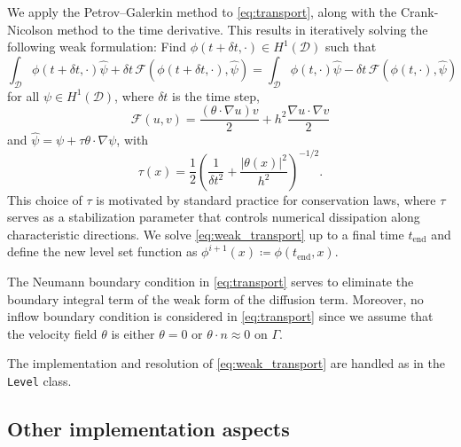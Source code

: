 \documentclass[preprint,9pt]{elsarticle}
\begin{document}
We apply the Petrov--Galerkin method \cite{MR1640142} to \eqref{eq:transport},
along with the Crank-Nicolson method to the time derivative.
This results in iteratively solving the following weak formulation:
Find $\phi(t+\delta t,\cdot)\in H^1(\mathcal{D})$ such that
\begin{equation}\label{eq:weak_transport}
	\int_{\mathcal{D}} \phi(t+\delta t,\cdot)\hat{\psi} +
		\delta t \, \mathcal{F}(\phi(t+\delta t,\cdot), \hat{\psi})
	= \int_{\mathcal{D}} \phi(t,\cdot) \hat{\psi} -
		\delta t \, \mathcal{F}(\phi(t,\cdot), \hat{\psi})	
\end{equation}
for all $\psi\in H^1(\mathcal{D})$, where $\delta t$ is the time step,
\[
	\mathcal{F}(u,v)=\frac{(\theta \cdot \nabla u) v}{2}
	+ h^2\frac{\nabla u \cdot \nabla v}{2}
\]
and $\hat{\psi}=\psi+\tau \theta\cdot\nabla\psi$, with 
\begin{equation}\label{eq:tau_lv}
	\tau(x) = \frac{1}{2}\left(\frac{1}{\delta t^2}
	+ \frac{|\theta(x)|^2}{h^2}\right)^{-1/2}.
\end{equation}
This choice of $\tau$ is motivated by standard practice for conservation laws,
where $\tau$ serves as a stabilization parameter that controls
numerical dissipation along characteristic directions.
We solve \eqref{eq:weak_transport} up to a final time $t_{\text{end}}$ and
define the new level set function as
$\phi^{i+1}(x)\coloneqq\phi(t_\text{end},x)$.

The Neumann boundary condition in \eqref{eq:transport} serves to eliminate
the boundary integral term of the weak form of the diffusion term.
Moreover, no inflow boundary condition is considered in \eqref{eq:transport}
since we assume that the velocity field $\theta$ is either $\theta = 0$ 
or $\theta \cdot n \approx 0$ on $\Gamma$.

The implementation and resolution of \eqref{eq:weak_transport} are handled
as in the \texttt{Level} class. 

\subsection{Other implementation aspects}\label{sub:other}
\end{document}
